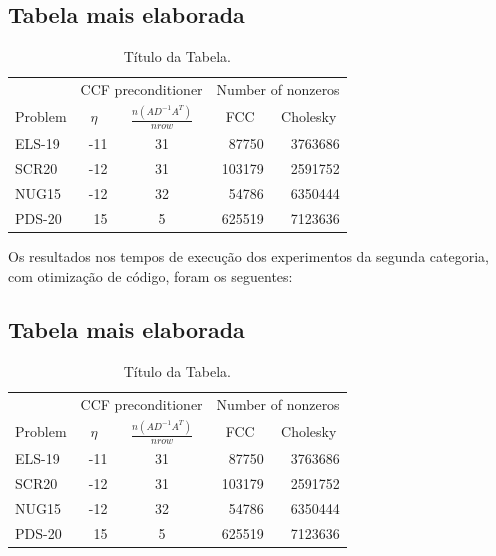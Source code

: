 \documentclass[a4paper,12pt,fleqn]{article}
\begin{document}
\subsection{Tabela mais elaborada}
\begin{table}[htb]
\begin{center}
\begin{tabular}{|l|r|c|r|r|} \hline
            & \multicolumn{2}{|c|}{{CCF preconditioner}} & \multicolumn{2}{|c|}{{Number of nonzeros}} \\ \cline{2-5}
{Problem}   & \multicolumn{1}{|c|}{$\eta$}  & \multicolumn{1}{|c|}{$ \frac{n(AD^{-1}A^T)}{nrow}$} & \multicolumn{1}{|c|}{FCC} & \multicolumn{1}{|c|}{Cholesky}  \\ \hline \hline
ELS-19    &  -11 & 31 &  87750  & 3763686  \\\hline
SCR20     &  -12 & 31 &  103179 & 2591752  \\\hline
NUG15     &  -12 & 32 &  54786  & 6350444 \\\hline
PDS-20    &   15 & 5  &  625519 & 7123636\\\hline
\end{tabular}
\caption{Título da Tabela.}   
\label{tabn}
\end{center}
\end{table}
 
Os resultados nos tempos de execução dos experimentos da segunda categoria, com otimização de código, foram os seguentes: 

\subsection{Tabela mais elaborada}
\begin{table}[htb]
\begin{center}
\begin{tabular}{|l|r|c|r|r|} \hline
            & \multicolumn{2}{|c|}{{CCF preconditioner}} & \multicolumn{2}{|c|}{{Number of nonzeros}} \\ \cline{2-5}
{Problem}   & \multicolumn{1}{|c|}{$\eta$}  & \multicolumn{1}{|c|}{$ \frac{n(AD^{-1}A^T)}{nrow}$} & \multicolumn{1}{|c|}{FCC} & \multicolumn{1}{|c|}{Cholesky}  \\ \hline \hline
ELS-19    &  -11 & 31 &  87750  & 3763686  \\\hline
SCR20     &  -12 & 31 &  103179 & 2591752  \\\hline
NUG15     &  -12 & 32 &  54786  & 6350444 \\\hline
PDS-20    &   15 & 5  &  625519 & 7123636\\\hline
\end{tabular}
\caption{Título da Tabela.}   
\label{tabn2}
\end{center}
\end{table}
\end{document}
